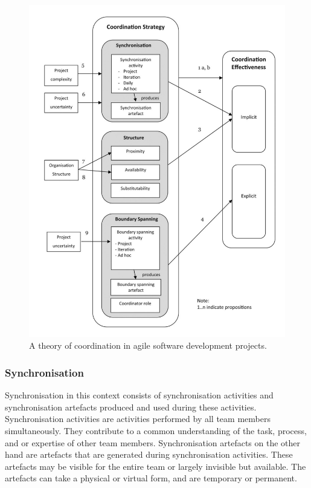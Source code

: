 \begin{figure}
\centering
\includegraphics[width=\textwidth]{images/Strode.pdf}
\caption{A theory of coordination in agile software development projects.}
\label{strode}
\end{figure}

\subsubsection{Synchronisation}

Synchronisation in this context consists of synchronisation activities and synchronisation artefacts produced and used during these activities. Synchronisation activities are activities performed by all team members simultaneously. They contribute to a common understanding of the task, process, and or expertise of other team members. Synchronisation artefacts on the other hand are artefacts that are generated during synchronisation activities. These artefacts may be visible for the entire team or largely invisible but available. The artefacts can take a physical or virtual form, and are temporary or permanent.

